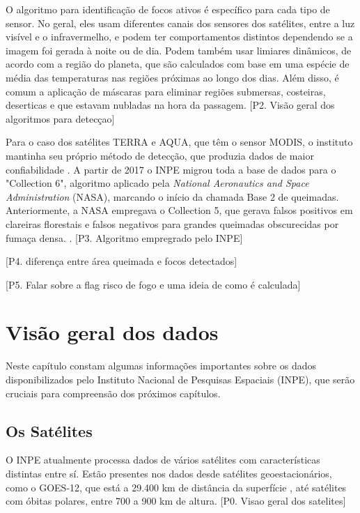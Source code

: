 \documentclass[cic,tc]{iiufrgs}
\begin{document}
O algoritmo para identificação de focos ativos é específico para cada tipo 
de sensor. No geral, eles usam diferentes canais dos sensores dos 
satélites, entre a luz visível e o infravermelho, e podem ter comportamentos 
distintos dependendo se a imagem foi gerada à noite ou de dia. Podem também 
usar limiares dinâmicos, de acordo com a região do planeta, que são calculados com 
base em uma espécie de média das temperaturas nas regiões próximas ao longo dos 
dias. Além disso, é comum a aplicação de máscaras para eliminar regiões submersas, 
costeiras, deserticas e que estavam nubladas na hora da passagem. 
[P2. Visão geral dos algoritmos para detecçao] \par

Para o caso dos satélites TERRA e AQUA, que têm o sensor MODIS, o 
instituto mantinha seu próprio método de detecção, que produzia dados de 
maior confiabilidade \citep{PerguntasFrequentesINPE}. 
A partir de 2017 o INPE migrou toda a base de dados para o "Collection 6", 
algoritmo aplicado pela \textit{National Aeronautics and Space Administration} 
(NASA), marcando o início da chamada Base 2 de queimadas. Anteriormente, a NASA 
empregava o Collection 5, que gerava falsos positivos em clareiras florestais e 
falsos negativos para grandes queimadas obscurecidas por fumaça densa.
\citep{SCHROEDER2008}. [P3. Algoritmo empregrado pelo INPE] \par



[P4. diferença entre área queimada e focos detectados] \par

[P5. Falar sobre a flag risco de fogo e uma ideia de como é calculada] \par


\chapter{Visão geral dos dados}

Neste capítulo constam algumas informações importantes sobre os 
dados disponibilizados pelo Instituto Nacional de Pesquisas Espaciais (INPE), 
que serão cruciais para compreensão dos próximos capítulos. 


\section{Os Satélites}

O INPE atualmente processa dados de vários satélites com características
distintas entre sí. Estão presentes nos dados desde satélites geoestacionários, 
como o GOES-12, que está a 29.400 km de distância da superfície 
\citep{GOES12Algo}, até satélites com óbitas polares, entre 700 a 900 km de altura.
[P0. Visao geral dos satelites] \par
\end{document}

